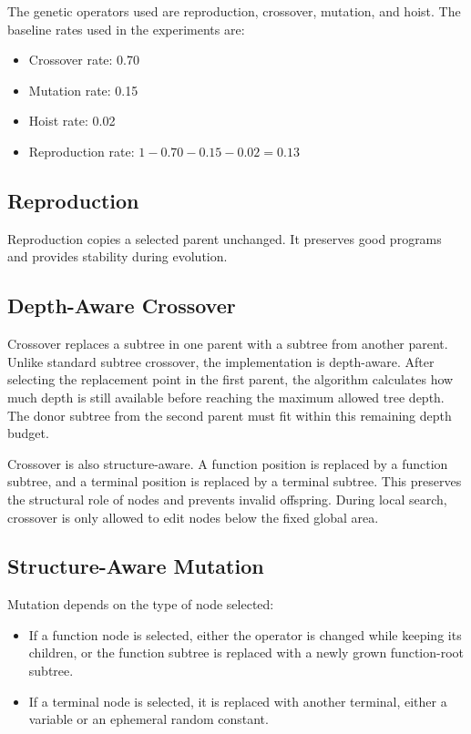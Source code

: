 \documentclass{article}
\begin{document}
The genetic operators used are reproduction, crossover, mutation, and hoist. The baseline rates used in the experiments are:

\begin{itemize}
    \item Crossover rate: 0.70
    \item Mutation rate: 0.15
    \item Hoist rate: 0.02
    \item Reproduction rate: $1 - 0.70 - 0.15 - 0.02 = 0.13$
\end{itemize}

\subsection{Reproduction}

Reproduction copies a selected parent unchanged. It preserves good programs and provides stability during evolution.

\subsection{Depth-Aware Crossover}

Crossover replaces a subtree in one parent with a subtree from another parent. Unlike standard subtree crossover, the implementation is depth-aware. After selecting the replacement point in the first parent, the algorithm calculates how much depth is still available before reaching the maximum allowed tree depth. The donor subtree from the second parent must fit within this remaining depth budget.

Crossover is also structure-aware. A function position is replaced by a function subtree, and a terminal position is replaced by a terminal subtree. This preserves the structural role of nodes and prevents invalid offspring. During local search, crossover is only allowed to edit nodes below the fixed global area.

\subsection{Structure-Aware Mutation}

Mutation depends on the type of node selected:

\begin{itemize}
    \item If a function node is selected, either the operator is changed while keeping its children, or the function subtree is replaced with a newly grown function-root subtree.
    \item If a terminal node is selected, it is replaced with another terminal, either a variable or an ephemeral random constant.
\end{itemize}
\end{document}

